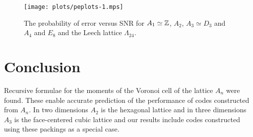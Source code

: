 \documentclass[draftcls, onecolumn, 11pt]{IEEEtran}
\begin{document}


\begin{figure*}[tp]
	\centering
		\texttt{[image: plots/peplots-1.mps]}
		\caption{The probability of error versus SNR for $A_1 \simeq {\mathbb Z}$, $A_2$, $A_3\simeq D_3$ and $A_4$ and $E_8$ and the Leech lattice $\Lambda_{24}$.}
		\label{fig:peplots}
\end{figure*}


\section{Conclusion}

Recursive formulae for the moments of the Voronoi cell of the lattice $A_n$ were found.  These enable accurate prediction of the performance of codes constructed from $A_n$.  In two dimensions $A_2$ is the hexagonal lattice and in three dimensions $A_3$ is the face-centered cubic lattice and our results include codes constructed using these packings as a special case.  %
\end{document}
